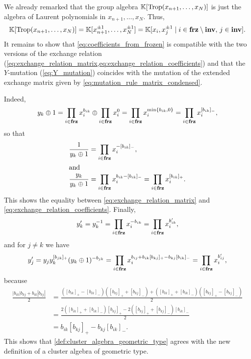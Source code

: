 We already remarked that the group algebra $\mathbb{K}[\operatorname{Trop}(x_{n+1}, \dots, x_{N})]$ is just
the algebra of Laurent polynomials in $x_{n+1}, \dots, x_N$. Thus,
\begin{equation*}
	\mathbb{K}[\operatorname{Trop}(x_{n+1}, \dots, x_N)] = \mathbb{K}[x_{n+1}^{\pm 1}, \dots, x_N^{\pm 1}] = \mathbb{K}[x_i, x_j^{\pm 1} \mid i \in \mathbf{frz} \setminus \mathbf{inv},\,j \in \mathbf{inv}].
\end{equation*}
%
It remains to show that \cref{eq:coefficients_from_frozen} is compatible with the two
versions of the exchange relation
(\cref{eq:exchange_relation_matrix,eq:exchange_relation_coefficients}) and that the
$Y$-mutation (\cref{eq:Y_mutation}) coincides with the mutation of the extended
exchange matrix given by \cref{eq:mutation_rule_matrix_condensed}.

Indeed,
\begin{equation*}
	y_k \oplus 1 = \prod_{i \in \mathbf{frz}} x_i^{b_{ik}} \oplus \prod_{i \in \mathbf{frz}} x_i^0 = \prod_{i \in \mathbf{frz}}x_i^{\min\{b_{ik}, 0\}} = \prod_{i \in \mathbf{frz}} x_i^{[b_{ik}]_{-}},
\end{equation*}
so that
\begin{align*}
	\frac{1}{y_k \oplus 1}   & = \prod_{i \in \mathbf{frz}} x_i^{-[b_{ik}]_{-}},                                                 \\
	\shortintertext{and}
	\frac{y_k}{y_k \oplus 1} & = \prod_{i \in \mathbf{frz}} x_i^{b_{ik} - [b_{ik}]_{-}} = \prod_{i \in \mathbf{frz}} x_i^{[b_{ik}]_{+}}.
\end{align*}
%
This shows the equality between \cref{eq:exchange_relation_matrix} and
\cref{eq:exchange_relation_coefficients}. Finally,
\begin{equation*}
	y_k' = y_k^{-1} = \prod_{i \in \mathbf{frz}}x_i^{-b_{ik}} = \prod_{i \in \mathbf{frz}}x_i^{b'_{ik}},
\end{equation*}
and for $j\neq k$ we have
\begin{equation*}
	y'_j = y_j y_k^{[b_{jk}]_{+}}(y_k \oplus 1)^{-b_{jk}} = \prod_{i \in \mathbf{frz}}x_i^{b_{ij} + b_{ik}[b_{kj}]_{+} - b_{kj}[b_{ik}]_{-}} = \prod_{i \in \mathbf{frz}}x_i^{b'_{ij}},
\end{equation*}
%
because
\begin{align*}
	\frac{|b_{ik}|b_{kj} + b_{ik}|b_{kj}|}{2}
	 & =\frac{([b_{ik}]_{+} - [b_{ik}]_{-})([b_{kj}]_{+} + [b_{kj}]_{-}) + ([b_{ik}]_{+} + [b_{ik}]_{-})([b_{kj}]_{+} - [b_{kj}]_{-})}{2} \\
	 & =\frac{2([b_{ik}]_{+} + [b_{ik}]_{-})[b_{kj}]_{+} - 2([b_{kj}]_{+} + [b_{kj}]_{-})[b_{ik}]_{-}}{2}                                 \\
	 & =  b_{ik}[b_{kj}]_{+} - b_{kj}[b_{ik}]_{-}.
\end{align*}
%
This shows that \cref{def:cluster_algebra_geometric_type} agrees with the new
definition of a cluster algebra of geometric type.

